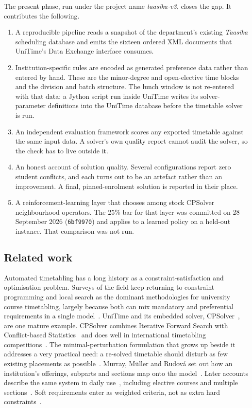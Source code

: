 \documentclass[journal]{IEEEtran}
\begin{document}
The present phase, run under the project name \emph{taasika-v3}, closes the gap. It contributes the following.
\begin{enumerate}
\item A reproducible pipeline reads a snapshot of the department's existing \emph{Taasika} scheduling database and emits the sixteen ordered XML documents that UniTime's Data Exchange interface consumes.
\item Institution-specific rules are encoded as generated preference data rather than entered by hand. These are the minor-degree and open-elective time blocks and the division and batch structure. The lunch window is not re-entered with that data: a Jython script run inside UniTime writes its solver-parameter definitions into the UniTime database before the timetable solver is run.
\item An independent evaluation framework scores any exported timetable against the same input data. A solver's own quality report cannot audit the solver, so the check has to live outside it.
\item An honest account of solution quality. Several configurations report zero student conflicts, and each turns out to be an artefact rather than an improvement. A final, pinned-enrolment solution is reported in their place.
\item A reinforcement-learning layer that chooses among stock CPSolver neighbourhood operators. The 25\% bar for that layer was committed on 28 September 2026 (\texttt{6bf9970}) and applies to a learned policy on a held-out instance. That comparison was not run.
\end{enumerate}

\subsection{Related work}
Automated timetabling has a long history as a constraint-satisfaction and optimisation problem. Surveys of the field keep returning to constraint programming and local search as the dominant methodologies for university course timetabling, largely because both can mix mandatory and preferential requirements in a single model~\cite{schaerf1999survey}. UniTime and its embedded solver, CPSolver~\cite{cpsolver}, are one mature example. CPSolver combines Iterative Forward Search with Conflict-based Statistics~\cite{muller2004constraint} and does well in international timetabling competitions~\cite{muller2009itc,muller2025itc}. The minimal-perturbation formulation that grows up beside it addresses a very practical need: a re-solved timetable should disturb as few existing placements as possible~\cite{muller2007minimal}. Murray, M\"uller and Rudov\'a set out how an institution's offerings, subparts and sections map onto the model~\cite{murray2007modeling}. Later accounts describe the same system in daily use~\cite{rudova2011complex}, including elective courses and multiple sections~\cite{muller2016curriculum}. Soft requirements enter as weighted criteria, not as extra hard constraints~\cite{rudova2003soft}.
\end{document}
